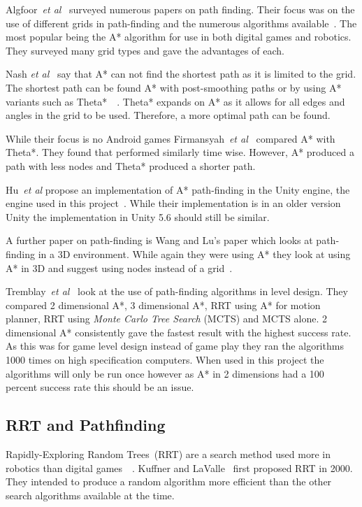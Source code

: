 \documentclass[journal]{IEEEtran}
\begin{document}
Algfoor~\textit{et al}~\cite{Algfoor2015} surveyed numerous papers on path finding. Their focus was on the use of different grids in path-finding and the numerous algorithms available~\cite{Algfoor2015}. The most popular being the A* algorithm for use in both digital games and robotics. They surveyed many grid types and gave the advantages of each. 

Nash \textit{et al}~\cite{Nash2007} say that A* can not find the shortest path as it is limited to the grid. The shortest path can be found A* with post-smoothing paths or by using A* variants such as Theta*~\cite{Nash2007}~\cite{Firmansyah2016}. Theta* expands on A* as it allows for all edges and angles in the grid to be used. Therefore, a more optimal path can be found.

While their focus is no Android games Firmansyah~\textit{et al}~\cite{Firmansyah2016} compared A* with Theta*. They found that performed similarly time wise. However, A* produced a path with less nodes and Theta* produced a shorter path. 

Hu~\textit{et al} propose an implementation of A* path-finding in the Unity engine, the engine used in this project~\cite{Hu2012}.  While their implementation is in an older version Unity the implementation in Unity 5.6 should still be similar. 

A further paper on path-finding is Wang and Lu's paper which looks at path-finding in a 3D environment. While again they were using A* they look at using A* in 3D and suggest using nodes instead of a grid~\cite{wang2012}.

Tremblay~\textit{et al}~\cite{Tremblay2014} look at the use of path-finding algorithms in level design. They compared 2 dimensional A*, 3 dimensional A*, RRT using A* for motion planner, RRT using \textit{Monte Carlo Tree Search} (MCTS) and MCTS alone. 2 dimensional A* consistently gave the fastest result with the highest success rate. As this was for game level design instead of game play they ran the algorithms 1000 times on high specification computers. When used in this project the algorithms will only be run once however as A* in 2 dimensions had a 100 percent success rate this should be an issue. 

\subsection{RRT and Pathfinding}
Rapidly-Exploring Random Trees~(RRT) are a search method used more in robotics than digital games~\cite{LaValle1998}~\cite{Kuffner2000}. Kuffner and LaValle~\cite{Kuffner2000} first proposed RRT in 2000. They intended to produce a random algorithm more efficient than the other search algorithms available at the time. 
\end{document}

